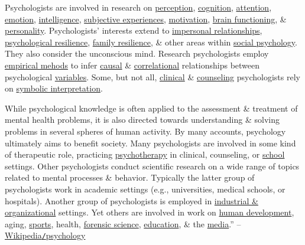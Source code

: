 \documentclass[oneside]{book}
\numberwithin{equation}{section}
\begin{document}
Psychologists are involved in research on \href{https://en.wikipedia.org/wiki/Perception}{perception}, \href{https://en.wikipedia.org/wiki/Cognition}{cognition}, \href{https://en.wikipedia.org/wiki/Attention}{attention}, \href{https://en.wikipedia.org/wiki/Emotion}{emotion}, \href{https://en.wikipedia.org/wiki/Intelligence}{intelligence}, \href{https://en.wikipedia.org/wiki/Phenomenology_(psychology)}{subjective experiences}, \href{https://en.wikipedia.org/wiki/Motivation}{motivation}, \href{https://en.wikipedia.org/wiki/Human_brain#Function}{brain functioning}, \& \href{https://en.wikipedia.org/wiki/Personality_psychology}{personality}. Psychologists' interests extend to \href{https://en.wikipedia.org/wiki/Interpersonal_relationship}{impersonal relationships}, \href{https://en.wikipedia.org/wiki/Psychological_resilience}{psychological resilience}, \href{https://en.wikipedia.org/wiki/Family_resilience}{family resilience}, \& other areas within \href{https://en.wikipedia.org/wiki/Social_psychology}{social psychology}. They also consider the unconscious mind. Research psychologists employ \href{https://en.wikipedia.org/wiki/Empirical_research}{empirical mehods} to infer \href{https://en.wikipedia.org/wiki/Causality}{causal} \& \href{https://en.wikipedia.org/wiki/Correlation}{correlational} relationships between psychological \href{https://en.wikipedia.org/wiki/Dependent_and_independent_variables}{variables}. Some, but not all, \href{https://en.wikipedia.org/wiki/Clinical_psychology}{clinical} \& \href{https://en.wikipedia.org/wiki/Counseling_psychology}{counseling} psychologists rely on \href{https://en.wikipedia.org/wiki/Hermeneutics#Psychology_and_cognitive_science}{symbolic interpretation}.

While psychological knowledge is often applied to the assessment \& treatment of mental health problems, it is also directed towards understanding \& solving problems in several spheres of human activity. By many accounts, psychology ultimately aims to benefit society. Many psychologists are involved in some kind of therapeutic role, practicing \href{https://en.wikipedia.org/wiki/Psychotherapy}{psychotherapy} in clinical, counseling, or \href{https://en.wikipedia.org/wiki/School_psychology}{school} settings. Other psychologists conduct scientific research on a wide range of topics related to mental processes \& behavior. Typically the latter group of psychologists work in academic settings (e.g., universities, medical schools, or hospitals). Another group of psychologists is employed in \href{https://en.wikipedia.org/wiki/Industrial_and_organizational_psychology}{industrial \& organizational} settings. Yet others are involved in work on \href{https://en.wikipedia.org/wiki/Developmental_psychology}{human development}, aging, \href{https://en.wikipedia.org/wiki/Sports_psychology}{sports}, health, \href{https://en.wikipedia.org/wiki/Forensic_psychology}{forensic science}, \href{https://en.wikipedia.org/wiki/Educational_psychology}{education}, \& the \href{https://en.wikipedia.org/wiki/Media_psychology}{media}.'' -- \href{https://en.wikipedia.org/wiki/Psychology}{Wikipedia\texttt{/}psychology}
\end{document}
